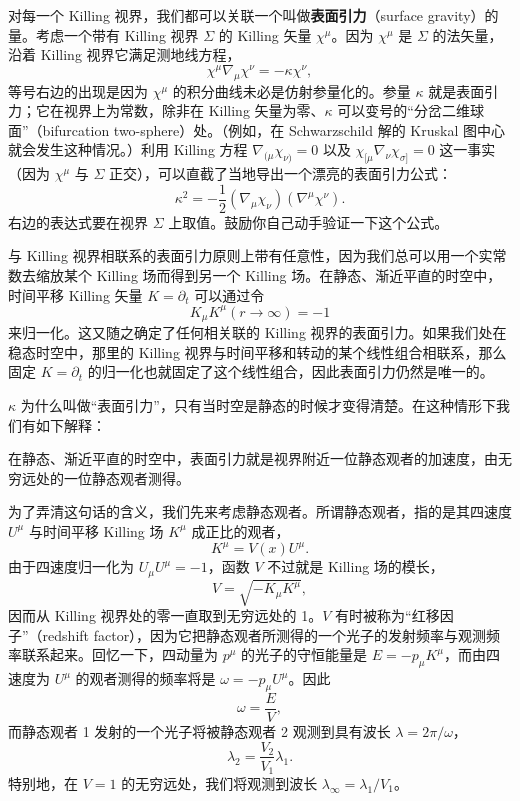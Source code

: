 对每一个 Killing 视界，我们都可以关联一个叫做\textbf{表面引力}（surface gravity）的量。考虑一个带有 Killing 视界 $\Sigma$ 的 Killing 矢量 $\chi^{\mu}$。因为 $\chi^{\mu}$ 是 $\Sigma$ 的法矢量，沿着 Killing 视界它满足测地线方程，
\begin{equation*}
\chi^\mu\nabla_\mu\chi^\nu = -\kappa\chi^\nu,
\tag{6.8}
\end{equation*}
等号右边的出现是因为 $\chi^{\mu}$ 的积分曲线未必是仿射参量化的。参量 $\kappa$ 就是表面引力；它在视界上为常数，除非在 Killing 矢量为零、$\kappa$ 可以变号的“分岔二维球面”（bifurcation two-sphere）处。（例如，在 Schwarzschild 解的 Kruskal 图中心就会发生这种情况。）利用 Killing 方程 $\nabla_{(\mu}\chi_{\nu)}=0$ 以及 $\chi_{[\mu}\nabla_\nu\chi_{\sigma]}=0$ 这一事实（因为 $\chi^{\mu}$ 与 $\Sigma$ 正交），可以直截了当地导出一个漂亮的表面引力公式：
\begin{equation*}
\kappa^{2} = -\frac{1}{2}(\nabla_\mu\chi_\nu)(\nabla^\mu\chi^\nu).
\tag{6.9}
\end{equation*}
右边的表达式要在视界 $\Sigma$ 上取值。鼓励你自己动手验证一下这个公式。

与 Killing 视界相联系的表面引力原则上带有任意性，因为我们总可以用一个实常数去缩放某个 Killing 场而得到另一个 Killing 场。在静态、渐近平直的时空中，时间平移 Killing 矢量 $K=\partial_t$ 可以通过令
\begin{equation*}
K_\mu K^\mu(r\to\infty) = -1
\tag{6.10}
\end{equation*}
来归一化。这又随之确定了任何相关联的 Killing 视界的表面引力。如果我们处在稳态时空中，那里的 Killing 视界与时间平移和转动的某个线性组合相联系，那么固定 $K=\partial_t$ 的归一化也就固定了这个线性组合，因此表面引力仍然是唯一的。

$\kappa$ 为什么叫做“表面引力”，只有当时空是静态的时候才变得清楚。在这种情形下我们有如下解释：

在静态、渐近平直的时空中，表面引力就是视界附近一位静态观者的加速度，由无穷远处的一位静态观者测得。

为了弄清这句话的含义，我们先来考虑静态观者。所谓静态观者，指的是其四速度 $U^{\mu}$ 与时间平移 Killing 场 $K^{\mu}$ 成正比的观者，
\begin{equation*}
K^\mu = V(x)U^\mu.
\tag{6.11}
\end{equation*}
由于四速度归一化为 $U_\mu U^{\mu}=-1$，函数 $V$ 不过就是 Killing 场的模长，
\begin{equation*}
V = \sqrt{-K_\mu K^\mu},
\tag{6.12}
\end{equation*}
因而从 Killing 视界处的零一直取到无穷远处的 1。$V$ 有时被称为“红移因子”（redshift factor），因为它把静态观者所测得的一个光子的发射频率与观测频率联系起来。回忆一下，四动量为 $p^{\mu}$ 的光子的守恒能量是 $E=-p_\mu K^{\mu}$，而由四速度为 $U^{\mu}$ 的观者测得的频率将是 $\omega=-p_\mu U^{\mu}$。因此
\begin{equation*}
\omega = \frac{E}{V},
\tag{6.13}
\end{equation*}
而静态观者 1 发射的一个光子将被静态观者 2 观测到具有波长 $\lambda=2\pi/\omega$，
\begin{equation*}
\lambda_2 = \frac{V_2}{V_1}\lambda_1.
\tag{6.14}
\end{equation*}
特别地，在 $V=1$ 的无穷远处，我们将观测到波长 $\lambda_{\infty}=\lambda_{1}/V_{1}$。

